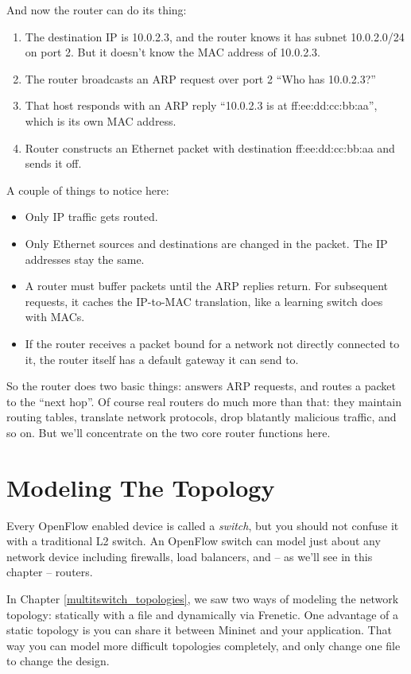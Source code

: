 And now the router can do its thing:

\begin{enumerate}
\item The destination IP is 10.0.2.3, and the router knows it has subnet 10.0.2.0/24
on port 2.  But it doesn't know the MAC address of 10.0.2.3.
\item The router broadcasts an ARP request over port 2 ``Who has 10.0.2.3?''
\item That host responds with an ARP reply ``10.0.2.3 is at ff:ee:dd:cc:bb:aa'', which is its 
own MAC address.
\item Router constructs an Ethernet packet with destination ff:ee:dd:cc:bb:aa and sends it off.
\end{enumerate}

A couple of things to notice here:

\begin{itemize}
\item Only IP traffic gets routed.  
\item Only Ethernet sources and destinations are changed in the packet.  The IP addresses stay the same.
\item A router must buffer packets until the ARP replies return.  For subsequent requests, it caches the
IP-to-MAC translation, like a learning switch does with MACs.
\item If the router receives a packet bound for a network not directly connected to it, the router
itself has a default gateway it can send to.  
\end{itemize}

So the router does two basic things: answers ARP requests, and routes
a packet to the ``next hop''.  Of course real routers do much more than that: they maintain routing tables,
translate network protocols, drop blatantly malicious traffic, and so on.  But we'll concentrate 
on the two core router functions here.

\section{Modeling The Topology}
\label{routing:topo}

Every OpenFlow enabled device is called a \emph{switch}, but you should not confuse it
with a traditional L2 switch.  An OpenFlow switch can model just about any network device
including firewalls, load balancers, and -- as we'll see in this chapter -- routers.  

In Chapter \ref{multitswitch_topologies}, we saw two ways of modeling the network topology:
statically with a  file and dynamically via Frenetic.  One advantage of a
static topology is you can share it between Mininet and your application.  That 
way you can model more difficult topologies completely, and only change one file
to change the design.  

